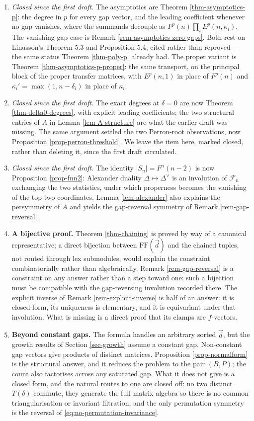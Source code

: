 \documentclass[11pt, a4paper, abstract=yes]{scrartcl}
\theoremstyle{definition}
\theoremstyle{remark}
\theoremstyle{plain}
\begin{document}
\begin{enumerate}
\item \emph{Closed since the first draft.} The asymptotics are Theorem \ref{thm-asymptotics-p}: the degree
in \(p\) for every gap vector, and the leading coefficient whenever no gap vanishes, where the
summands decouple as \(F^p(n)\prod_iE^p(n,\kappa_i)\). The vanishing-gap case is
Remark \ref{rem-asymptotics-zero-gaps}. Both rest on Linusson's Theorem 5.3 and Proposition 5.4,
cited rather than reproved --- the same status Theorem \ref{thm-poly-p} already had. The proper
variant is Theorem \ref{thm-asymptotics-p-proper}: the same transport, on the principal block of
the proper transfer matrices, with \(E^p(n,1)\) in place of \(F^p(n)\) and
\(\kappa_i'=\max(1,n-\delta_i)\) in place of \(\kappa_i\).
\item \emph{Closed since the first draft.} The exact degrees at \(\delta=0\) are now
Theorem \ref{thm-delta0-degrees}, with explicit leading coefficients; the two structural entries of
\(A\) in Lemma \ref{lem-A-structure} are what the earlier draft was missing. The same argument
settled the two Perron-root observations, now Proposition \ref{prop-perron-threshold}. We leave the
item here, marked closed, rather than deleting it, since the first draft circulated.
\item \emph{Closed since the first draft.} The identity \(|S_n|=F^n(n-2)\) is now
Proposition \ref{prop-fnn2}: Alexander duality \(\Delta\mapsto\Delta^{\vee}\) is an involution of
\(\mathcal F_n\) exchanging the two statistics, under which properness becomes the vanishing of
the top two coordinates. Lemma \ref{lem-alexander} also explains the persymmetry of \(A\) and
yields the gap-reversal symmetry of Remark \ref{rem-gap-reversal}.
\item \textbf{A bijective proof.} Theorem \ref{thm-chaining} is proved by way of a canonical representative;
a direct bijection between \(\mathrm{FF}(\vec d)\) and the chained tuples, not routed through lex
submodules, would explain the constraint combinatorially rather than algebraically. Remark
\ref{rem-gap-reversal} is a constraint on any answer rather than a step toward one: such a
bijection must be compatible with the gap-reversing involution recorded there. The explicit
inverse of Remark \ref{rem-explicit-inverse} is half of an answer: it is closed-form, its
uniqueness is elementary, and it is equivariant under that involution. What is missing is a
direct proof that its clamps are \(f\)-vectors.
\item \textbf{Beyond constant gaps.} The formula handles an arbitrary sorted \(\vec d\), but the growth results of
Section \ref{sec-growth} assume a constant gap. Non-constant gap vectors give products of distinct
matrices. Proposition \ref{prop-normalform} is the structural answer, and it reduces the problem
to the pair \((B,P)\); the count also factorises across any saturated gap. What it does not give
is a closed form, and the natural routes to one are closed off: no two distinct \(T(\delta)\)
commute, they generate the full matrix algebra so there is no common triangularisation or
invariant filtration, and the only permutation symmetry is the reversal of
\eqref{eq:no-permutation-invariance}.
\end{enumerate}
\end{document}
